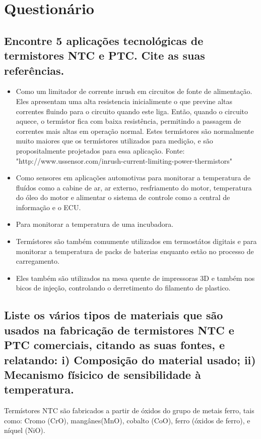 \documentclass[12pt, onecolumn]{IEEEtran}
\begin{document}
\section{Questionário}

\subsection{Encontre 5 aplicações tecnológicas de termistores NTC e PTC. Cite as suas referências.}
\begin{itemize}

  \item Como um limitador de corrente inrush em circuitos de fonte de alimentação. Eles apresentam uma alta resistencia inicialimente o que previne altas correntes fluindo para o circuito quando este liga. Então, quando o circuito aquece, o termístor fica com baixa resistência, permitindo a passagem de correntes mais altas em operação normal. Estes termístores são normalmente muito maiores que os termístores utilizados para medição, e são propositalmente projetados para essa aplicação. Fonte: "http://www.ussensor.com/inrush-current-limiting-power-thermistors"
  \item Como sensores em aplicações automotivas para monitorar a temperatura de fluídos como a cabine de ar, ar externo, resfriamento do motor, temperatura do óleo do motor e alimentar o sistema de controle como a central de informação e o ECU. 
  \item Para monitorar a temperatura de uma incubadora. 
  \item Termístores são também comumente utilizados em termostátos digitais e para monitorar a temperatura de packs de baterias enquanto estão no processo de carregamento.
  \item Eles também são utilizados na mesa quente de impressoras 3D e também nos bicos de injeção, controlando o derretimento do filamento de plastico.
\end{itemize}


\subsection{Liste os vários tipos de materiais que são usados na fabricação de termistores NTC e PTC comerciais, citando as suas fontes, e relatando: i) Composição do material usado; ii) Mecanismo físicico de sensibilidade à temperatura.}


Termístores NTC são fabricados a partir de óxidos do grupo de metais ferro, tais como: Cromo (CrO), mangânes(MnO), cobalto (CoO), ferro (óxidos de ferro), e níquel (NiO).
\end{document}
